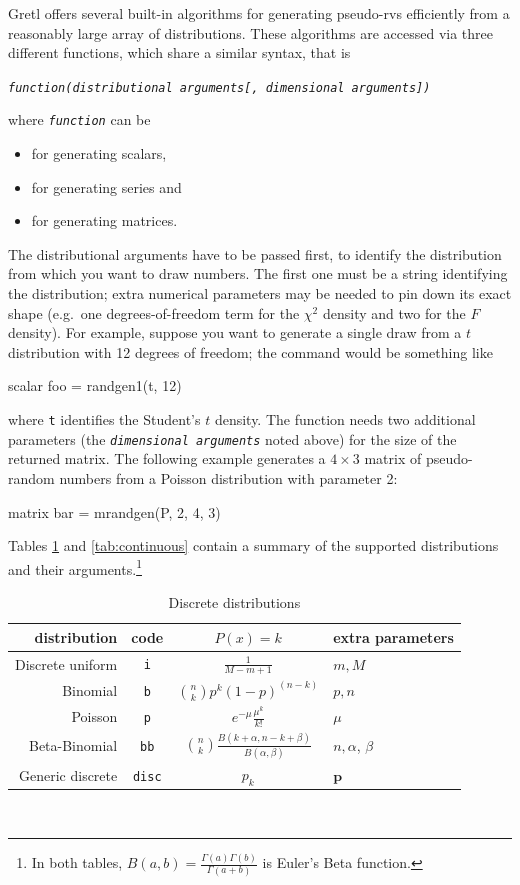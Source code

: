 Gretl offers several built-in algorithms for generating pseudo-rvs
efficiently from a reasonably large array of distributions. These
algorithms are accessed via three different functions, which share a
similar syntax, that is
\begin{flushleft}
  \emph{\texttt{function(distributional arguments[, dimensional arguments])}}
\end{flushleft}
where \emph{\texttt{function}} can be
\begin{itemize}
\item {} for generating scalars,
\item {} for generating series and
\item {} for generating matrices.
\end{itemize}

The distributional arguments have to be passed first, to identify the
distribution from which you want to draw numbers. The first one must
be a string identifying the distribution; extra numerical parameters
may be needed to pin down its exact shape (e.g.\ one
degrees-of-freedom term for the $\chi^2$ density and two for the $F$
density). For example, suppose you want to generate a single draw from
a $t$ distribution with 12 degrees of freedom; the command would be
something like
\begin{code}
  scalar foo = randgen1(t, 12)
\end{code}
where \texttt{t} identifies the Student's $t$ density. The
 function needs two additional parameters (the
\emph{\texttt{dimensional arguments}} noted above) for the size of the
returned matrix. The following example generates a $4 \times 3$ matrix
of pseudo-random numbers from a Poisson distribution with parameter 2:
\begin{code}
  matrix bar = mrandgen(P, 2, 4, 3)
\end{code}

Tables \ref{tab:discrete} and \ref{tab:continuous} contain a summary
of the supported distributions and their arguments.\footnote{In both
  tables, $B(a,b) = \frac{\Gamma(a) \Gamma(b)}{\Gamma(a+b)}$ is 
    Euler's Beta function.}

\begin{table}[htbp]
\centering
\begin{tabular}{rccl}
  \hline
  distribution	& code	& $P(x) = k$	& extra parameters \\
  \hline
Discrete uniform	& \texttt{i}	& $\frac{1}{M - m +1}$	& $m, M$ \\[6pt]
Binomial		& \texttt{b}	& ${n \choose k} p^k (1-p)^{(n-k)}$	& $p, n$ \\[6pt]
Poisson			& \texttt{p}	& $e^{-\mu} \frac{\mu^k}{k!}$	& $\mu$ \\[6pt]
Beta-Binomial		& \texttt{bb}	& ${n \choose k} \frac{B(k+\alpha,n-k+\beta)}
                          {B(\alpha,\beta)}$ & $n, \alpha$, $\beta$ \\[6pt]
Generic discrete	& \texttt{disc}	& $p_k$	& $\mathbf{p}$ \\[6pt]
  \hline
  \end{tabular}\
\caption{Discrete distributions}
\label{tab:discrete}
\end{table}

